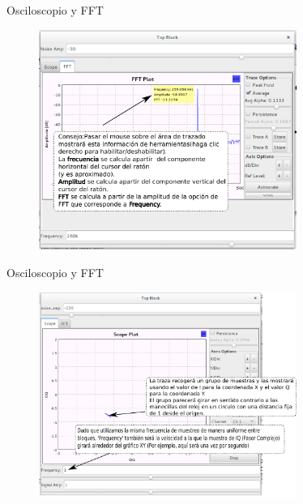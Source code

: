 \begin{frame}{Osciloscopio y FFT}
\begin{figure}[H]
\vspace{-3mm}
\centering
\includegraphics[width=0.75\textwidth]{parte1/lab2/pdf/lab2_12.pdf}
\end{figure}
\end{frame}

\begin{frame}{Osciloscopio y FFT}
\begin{figure}[H]
\centering
\includegraphics[width=0.75\textwidth]{parte1/lab2/pdf/lab2_13.pdf}
\end{figure}
\end{frame}

